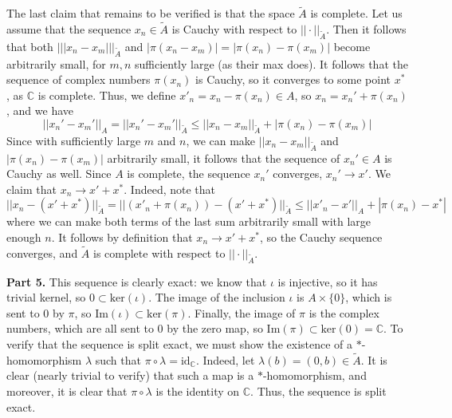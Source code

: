\documentclass[aps,pra,showpacs,notitlepage,onecolumn,superscriptaddress,nofootinbib]{revtex4-1}
\theoremstyle{definition}
\begin{document}
The last claim that remains to be verified is that the space $\widetilde{A}$ is complete. Let us assume that the sequence $x_n \in \widetilde{A}$ is Cauchy with respect to $||\cdot||_{\widetilde{A}}$. Then it follows that
both $||| x_n - x_m |||_{\widetilde{A}}$ and $|\pi(x_n - x_m)| = |\pi(x_n) - \pi(x_m)|$ become arbitrarily small, for $m, n$ sufficiently large (as their max does). It follows that the sequence of complex numbers $\pi(x_n)$ is Cauchy, so it converges to some point $x^{*}$, as $\mathbb{C}$ is complete.
Thus, we define $x'_n = x_n - \pi(x_n) \in A$, so $x_n = x_n' + \pi(x_n)$, and we have
\begin{equation}
  ||x_n' - x_m'||_{A} = ||x_n' - x_m'||_{\widetilde{A}} \leq ||x_n - x_m||_{\widetilde{A}} + |\pi(x_n) - \pi(x_m)|
\end{equation}
Since with sufficiently large $m$ and $n$, we can make $||x_n - x_m||_{\widetilde{A}}$ and $|\pi(x_n) - \pi(x_m)|$ arbitrarily small, it follows that the sequence of $x_n' \in A$ is Cauchy as well. Since $A$ is complete, the sequence $x_n'$ converges, $x_n' \rightarrow x'$.
We claim that $x_n \rightarrow x' + x^{*}$. Indeed, note that
\begin{equation}
  ||x_n - (x' + x^{*})||_{\widetilde{A}} = ||(x'_n + \pi(x_n)) - (x' + x^{*})||_{\widetilde{A}} \leq ||x'_n - x'||_A + |\pi(x_n) - x^{*}|
\end{equation}
where we can make both terms of the last sum arbitrarily small with large enough $n$. It follows by definition that $x_n \rightarrow x' + x^{*}$, so the Cauchy sequence converges, and $\widetilde{A}$ is complete with respect to $||\cdot||_{\widetilde{A}}$.
\newline

\noindent \textbf{Part 5.} This sequence is clearly exact: we know that $\iota$ is injective, so it has trivial kernel, so $0 \subset \text{ker}(\iota)$. The image of the inclusion $\iota$ is $A \times \{0\}$, which is sent to $0$ by $\pi$, so
$\text{Im}(\iota) \subset \text{ker}(\pi)$. Finally, the image of $\pi$ is the complex numbers, which are all sent to $0$ by the zero map, so $\text{Im}(\pi) \subset \text{ker}(0) = \mathbb{C}$. To verify that the sequence is split exact, we must show the
existence of a $*$-homomorphism $\lambda$ such that $\pi \circ \lambda = \text{id}_{\mathbb{C}}$. Indeed, let $\lambda(b) = (0, b) \in \widetilde{A}$. It is clear (nearly trivial to verify) that such a map is a $*$-homomorphism, and moreover, it is clear that $\pi \circ \lambda$
is the identity on $\mathbb{C}$. Thus, the sequence is split exact.
\newline
\end{document}
